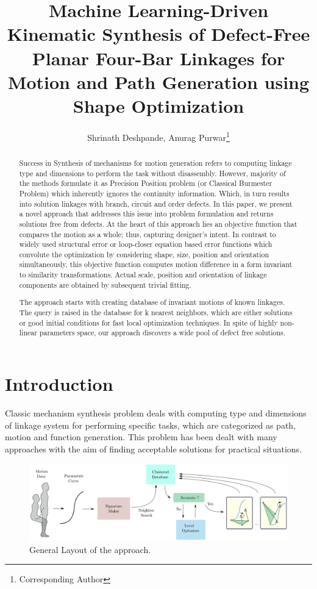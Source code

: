 \documentclass[twocolumn,10pt]{asme2e}
\title{Machine Learning-Driven Kinematic Synthesis of Defect-Free Planar Four-Bar Linkages for Motion and Path Generation using Shape Optimization}
\author{Shrinath Deshpande, Anurag Purwar\footnote{Corresponding Author}\\
    \affiliation{
    Computer-Aided Design and Innovation Lab \\
    Department of Mechanical Engineering\\
    Stony Brook University\\
    Stony Brook, New York, 11794-2300
    }
   }
\begin{document}
\maketitle

\begin{abstract}

Success in Synthesis of mechanisms for motion generation refers to computing linkage type and dimensions to perform the task without disassembly.
However, majority of the methods formulate it as Precision Position problem (or Classical Burmester Problem) which inherently ignores the continuity information.
Which, in turn results into solution linkages with branch, circuit and order defects.
In this paper, we present a novel approach that addresses this issue into problem formulation and returns solutions free from defects.
At the heart of this approach lies an objective function that compares the motion as a whole; thus, capturing designer's intent.
In contrast to widely used structural error or loop-closer equation based error functions which convolute the optimization by considering shape, size, position and orientation simultaneously, this objective function computes motion difference in a form invariant to similarity transformations.
Actual scale, position and orientation of linkage components are obtained by subsequent trivial fitting.

The approach starts with creating database of invariant motions of known linkages.
  The query is raised in the database for k nearest neighbors, which are either solutions or good initial conditions for fast local optimization techniques.
In spite of highly non-linear parameters space, our approach discovers a wide pool of defect free solutions.
\end{abstract}

\section{Introduction}
Classic mechanism synthesis problem deals with computing type and dimensions of linkage system for performing specific tasks, which are categorized as path, motion and function generation.
This problem has been dealt with many approaches with the aim of finding acceptable solutions for practical situations.

\begin{figure}
\centering
\includegraphics[width=\textwidth]{figure/overall_approach.eps}
  \caption{General Layout of the approach.}
\label{overallMethod}
\end{figure}
\end{document}
